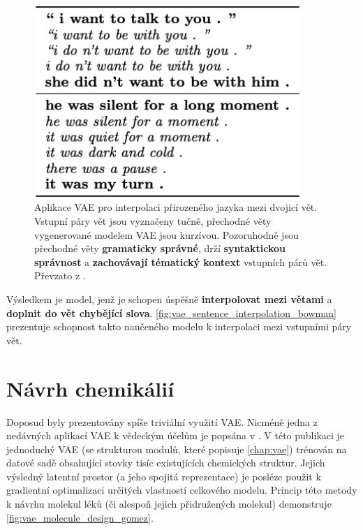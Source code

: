 \begin{figure}[H]
    \centering
    \includegraphics[width=0.9\textwidth]{figures/applications/vae_sentence_interpolation_bowman.png}
    \caption{Aplikace VAE pro interpolaci přirozeného jazyka mezi dvojicí vět. Vstupní páry vět jsou vyznačeny tučně, přechodné věty vygenerované modelem VAE jsou kurzívou.
    Pozoruhodně jsou přechodné věty \textbf{gramaticky správné}, drží \textbf{syntaktickou správnost} a \textbf{zachovávají tématický kontext} vstupních párů vět. Převzato z \cite{Bowman2016}.}
    \label{fig:vae_sentence_interpolation_bowman}
\end{figure}

Výsledkem je model, jenž je schopen úspěšně \textbf{interpolovat mezi větami} a \textbf{doplnit do vět chybějící slova}. \autoref{fig:vae_sentence_interpolation_bowman} prezentuje schopnost takto naučeného modelu k interpolaci mezi vstupními páry vět. \cite{Bowman2016}

\newpage
\section{Návrh chemikálií}
Doposud byly prezentovány spíše triviální využití VAE.
Nicméně jedna z nedávných aplikací VAE k vědeckým účelům je popsána v \cite{GomezBombarelli2018}.
V této publikaci je jednoduchý VAE (se strukturou modulů, které popisuje \autoref{chap:vae}) trénován na datové sadě obsahující stovky tisíc existujících chemických struktur.
Jejich výsledný latentní prostor (a jeho spojitá reprezentace) je posléze použit k gradientní optimalizaci určitých vlastností celkového modelu.
Princip této metody k návrhu molekul léků (či alespoň jejich přidružených molekul) demonstruje \autoref{fig:vae_molecule_design_gomez}. \cite{Kingma2019}

